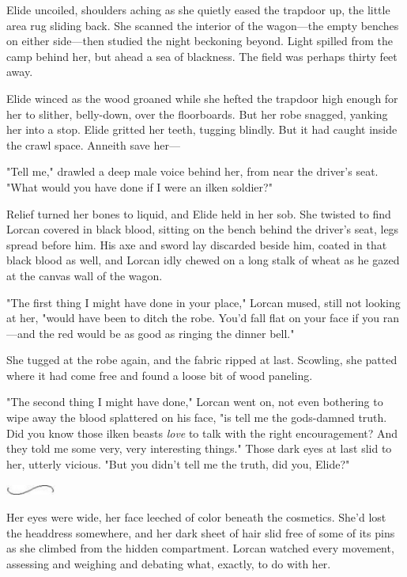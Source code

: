 Elide uncoiled, shoulders aching as she quietly eased the trapdoor up, the little area rug sliding back.
She scanned the interior of the wagon---the empty benches on either side---then studied the night beckoning beyond.
Light spilled from the camp behind her, but ahead  a sea of blackness.
The field was perhaps thirty feet away.

Elide winced as the wood groaned while she hefted the trapdoor high enough for her to slither, belly-down, over the floorboards.
But her robe snagged, yanking her into a stop.
Elide gritted her teeth, tugging blindly.
But it had caught inside the crawl space.
Anneith save her---

"Tell me," drawled a deep male voice behind her, from near the driver's seat.
"What would you have done if I were an ilken soldier?"

Relief turned her bones to liquid, and Elide held in her sob.
She twisted to find Lorcan covered in black blood, sitting on the bench behind the driver's seat, legs spread before him.
His axe and sword lay discarded beside him, coated in that black blood as well, and Lorcan idly chewed on a long stalk of wheat as he gazed at the canvas wall of the wagon.

"The first thing I might have done in your place," Lorcan mused, still not looking at her, "would have been to ditch the robe.
You'd fall flat on your face if you ran---and the red would be as good as ringing the dinner bell."

She tugged at the robe again, and the fabric ripped at last.
Scowling, she patted where it had come free and found a loose bit of wood paneling.

"The second thing I might have done," Lorcan went on, not even bothering to wipe away the blood splattered on his face, "is tell me the gods-damned truth.
Did you know those ilken beasts \emph{love} to talk with the right encouragement?
And they told me some very, very interesting things."
Those dark eyes at last slid to her, utterly vicious.
"But you didn't tell me the truth, did you, Elide?"

\begin{center}
	\includegraphics[width=0.65in,height=0.13in]{images/seperator}
\end{center}

Her eyes were wide, her face leeched of color beneath the cosmetics.
She'd lost the headdress somewhere, and her dark sheet of hair slid free of some of its pins as she climbed from the hidden compartment.
Lorcan watched every movement, assessing and weighing and debating what, exactly, to do with her.

